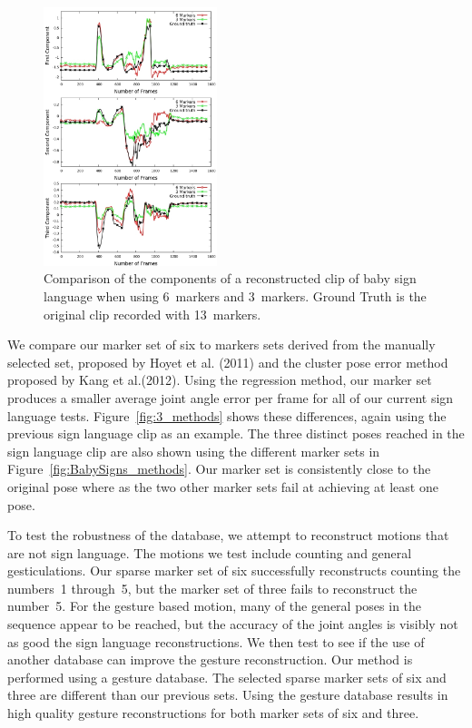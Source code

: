 \begin{figure}[h!]
  \centering
  \includegraphics[trim = 28mm 0mm 0mm 0mm,
width=0.45\textwidth]{images/Components_babySigns1.jpg} %
  \caption{Comparison of the components of a reconstructed clip of baby
sign language when using 6~markers and 3~markers. Ground Truth is
the original clip recorded with 13~markers.}
  \label{fig:BabySigns_comps}
\end{figure}

We compare our marker set of six to markers sets derived from the manually
selected set, proposed by Hoyet et al. (2011) and the cluster pose error
method proposed by Kang et al.(2012). Using the regression
method, our marker set produces a smaller average joint angle error per frame 
for all of our current sign language tests. Figure~\ref{fig:3_methods} shows 
these differences, again using the previous sign 
language clip as an example. The three distinct poses reached
in the sign language clip are also shown using the different marker
sets in Figure~\ref{fig:BabySigns_methods}. Our marker set is consistently
close to the original pose where as
the two other marker sets fail at achieving at least one pose.

To test the robustness of the database, we attempt to reconstruct 
motions that are not sign language. The motions we test include 
counting and general gesticulations. Our sparse marker set of six
successfully reconstructs counting the numbers~1 through~5, but the marker
set of three fails to reconstruct the number~5. For the gesture based motion,
many of the general poses in the sequence appear to be reached, but the accuracy
of the joint angles is visibly not as good the sign language reconstructions. We
then test to see if the use of another database can improve the gesture
reconstruction. Our method is performed using a gesture database. The selected
sparse marker sets of six and three are different than our previous sets.
Using the gesture database results in high quality gesture reconstructions
for both marker sets of six and three.

